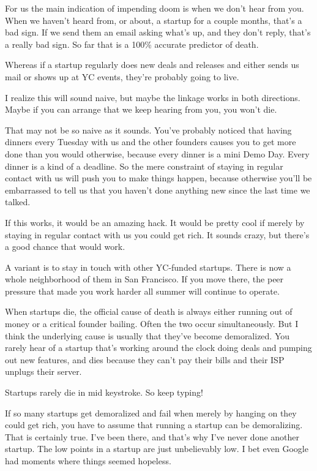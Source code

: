 \documentclass[12pt]{book}
\begin{document}
For us the main indication of impending doom is when we don't hear from
you. When we haven't heard from, or about, a startup for a couple
months, that's a bad sign. If we send them an email asking what's up,
and they don't reply, that's a really bad sign. So far that is a 100\%
accurate predictor of death.

Whereas if a startup regularly does new deals and releases and either
sends us mail or shows up at YC events, they're probably going to live.

I realize this will sound naive, but maybe the linkage works in both
directions. Maybe if you can arrange that we keep hearing from you, you
won't die.

That may not be so naive as it sounds. You've probably noticed that
having dinners every Tuesday with us and the other founders causes you
to get more done than you would otherwise, because every dinner is a
mini Demo Day. Every dinner is a kind of a deadline. So the mere
constraint of staying in regular contact with us will push you to make
things happen, because otherwise you'll be embarrassed to tell us that
you haven't done anything new since the last time we talked.

If this works, it would be an amazing hack. It would be pretty cool if
merely by staying in regular contact with us you could get rich. It
sounds crazy, but there's a good chance that would work.

A variant is to stay in touch with other YC-funded startups. There is
now a whole neighborhood of them in San Francisco. If you move there,
the peer pressure that made you work harder all summer will continue to
operate.

When startups die, the official cause of death is always either running
out of money or a critical founder bailing. Often the two occur
simultaneously. But I think the underlying cause is usually that they've
become demoralized. You rarely hear of a startup that's working around
the clock doing deals and pumping out new features, and dies because
they can't pay their bills and their ISP unplugs their server.

Startups rarely die in mid keystroke. So keep typing!

If so many startups get demoralized and fail when merely by hanging on
they could get rich, you have to assume that running a startup can be
demoralizing. That is certainly true. I've been there, and that's why
I've never done another startup. The low points in a startup are just
unbelievably low. I bet even Google had moments where things seemed
hopeless.
\end{document}
